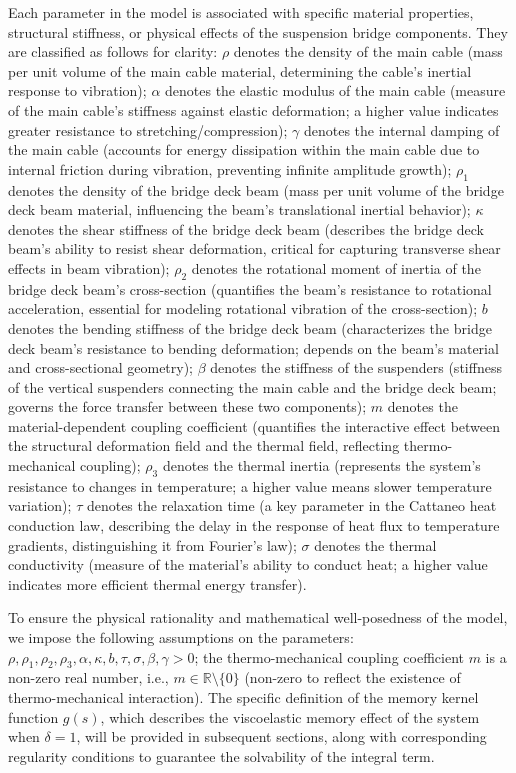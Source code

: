 \documentclass[11pt,reqno]{article}
\begin{document}
Each parameter in the model is associated with specific material properties, structural stiffness, or physical effects of the suspension bridge components. They are classified as follows for clarity: $\rho$ denotes the density of the main cable (mass per unit volume of the main cable material, determining the cable's inertial response to vibration); $\alpha$  denotes the elastic modulus of the main cable (measure of the main cable's stiffness against elastic deformation; a higher value indicates greater resistance to stretching/compression); $\gamma$ denotes the internal damping of the main cable (accounts for energy dissipation within the main cable due to internal friction during vibration, preventing infinite amplitude growth); $\rho_1$ denotes the density of the bridge deck beam (mass per unit volume of the bridge deck beam material, influencing the beam's translational inertial behavior); $\kappa$ denotes the shear stiffness of the bridge deck beam (describes the bridge deck beam's ability to resist shear deformation, critical for capturing transverse shear effects in beam vibration); $\rho_2$ denotes the rotational moment of inertia of the bridge deck beam's cross-section (quantifies the beam's resistance to rotational acceleration, essential for modeling rotational vibration of the cross-section); $b$ denotes the bending stiffness of the bridge deck beam (characterizes the bridge deck beam's resistance to bending deformation; depends on the beam's material and cross-sectional geometry); $\beta$ denotes the stiffness of the suspenders (stiffness of the vertical suspenders connecting the main cable and the bridge deck beam; governs the force transfer between these two components); $m$ denotes the material-dependent coupling coefficient (quantifies the interactive effect between the structural deformation field and the thermal field, reflecting thermo-mechanical coupling); $\rho_3$ denotes the thermal inertia (represents the system's resistance to changes in temperature; a higher value means slower temperature variation); $\tau$ denotes the relaxation time (a key parameter in the Cattaneo heat conduction law, describing the delay in the response of heat flux to temperature gradients, distinguishing it from Fourier's law); $\sigma$ denotes the thermal conductivity (measure of the material's ability to conduct heat; a higher value indicates more efficient thermal energy transfer).

To ensure the physical rationality and mathematical well-posedness of the model, we impose the following assumptions on the parameters:  $\rho, \rho_1, \rho_2, \rho_3, \alpha, \kappa, b, \tau, \sigma, \beta, \gamma > 0$; the thermo-mechanical coupling coefficient $m$ is a non-zero real number, i.e., $m \in \mathbb{R} \setminus \{0\}$ (non-zero to reflect the existence of thermo-mechanical interaction). The specific definition of the memory kernel function $g(s)$, which describes the viscoelastic memory effect of the system when $\delta=1$, will be provided in subsequent sections, along with corresponding regularity conditions to guarantee the solvability of the integral term.
	
\end{document}
